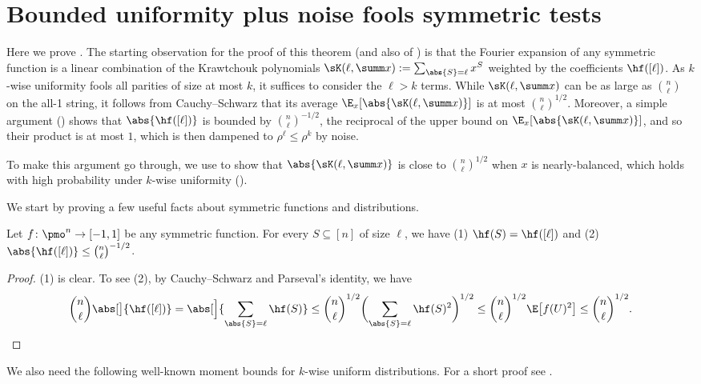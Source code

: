 \section{Bounded uniformity plus noise fools symmetric tests} \label{sec:bi+noise-fools-sym}

Here we prove .  The starting observation for the proof of this theorem (and also of ) is that the Fourier expansion of any symmetric function is a linear combination of the Krawtchouk polynomials $\sK(\ell,\summ x) := \sum_{\abs{S}=\ell} x^S$ weighted by the coefficients $\hf([\ell])$.
As $k$-wise uniformity fools all parities of size at most $k$, it suffices to consider the $\ell > k$ terms.
While $\sK(\ell,\summ x)$ can be as large as $\binom{n}{\ell}$ on the all-1 string, it follows from Cauchy--Schwarz that its average $\E_x[\abs{\sK(\ell,\summ x)}]$ is at most $\binom{n}{\ell}^{1/2}$.
Moreover, a simple argument () shows that $\abs{\hf([\ell])}$ is bounded by $\binom{n}{\ell}^{-1/2}$, the reciprocal of the upper bound on $\E_x[\abs{\sK(\ell, \summ x)}]$, and so their product is at most $1$, which is then dampened to $\rho^\ell \le \rho^k$ by noise.

To make this argument go through, we use  to show that $\abs{\sK(\ell,\summ x)}$ is close to $\binom{n}{\ell}^{1/2}$ when $x$ is nearly-balanced, which holds with high probability under $k$-wise uniformity ().

We start by proving a few useful facts about symmetric functions and distributions.

\begin{fact} \label{fact:coeff-sym-fcn}
  Let $f\colon\pmo^n \to [-1,1]$ be any symmetric function.
  For every $S \subseteq [n]$ of size $\ell$, we have (1) $\hf(S) = \hf([\ell])$ and (2) $\abs{\hf([\ell])} \le \binom{n}{\ell}^{-1/2}$.
\end{fact}
\begin{proof}
  (1) is clear.
  To see (2), by Cauchy--Schwarz and Parseval's identity, we have
  \[
    \binom{n}{\ell} \abs[\big] {\hf([\ell])}
    = \abs[\Big]{ \sum_{\abs{S}=\ell} \hf(S) }
    \le \binom{n}{\ell}^{1/2} \biggl( \sum_{\abs{S}=\ell} \hf(S)^2 \biggr)^{1/2}
    \le \binom{n}{\ell}^{1/2} \E\bigl[f(U)^2\bigr]
    \le \binom{n}{\ell}^{1/2} . \qedhere
  \]
\end{proof}
We also need the following well-known moment bounds for $k$-wise uniform distributions.
For a short proof see \cite[Lemma 32]{BHLV}.

